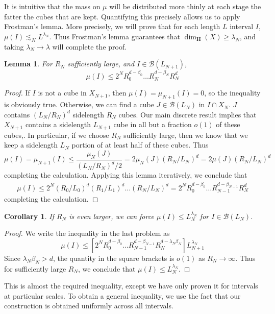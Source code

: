 \documentclass{article}
\theoremstyle{plain}
\newtheorem{lemma}{Lemma}
\newtheorem*{corollary}{Corollary}
\theoremstyle{plain}
\begin{document}
It is intuitive that the mass on $\mu$ will be distributed more thinly at each stage the fatter the cubes that are kept. Quantifying this precisely allows us to apply Frostman's lemma. More precisely, we will prove that for each length $L$ interval $I$, $\mu(I) \lesssim_N L^{\lambda_N}$. Thus Frostman's lemma guarantees that $\dim_{\mathbf{H}}(X) \geq \lambda_N$, and taking $\lambda_N \to \lambda$ will complete the proof.

\begin{lemma}
	For $R_N$ sufficiently large, and $I \in \mathcal{B}(L_{N+1})$,
	\[ \mu(I) \leq 2^N R_0^{d - \beta_0} \dots R_N^{d - \beta_N} R_N^d \]
\end{lemma}
\begin{proof}
	If $I$ is not a cube in $X_{N+1}$, then $\mu(I) = \mu_{N+1}(I) = 0$, so the inequality is obviously true. Otherwise, we can find a cube $J \in \mathcal{B}(L_N)$ in $I \cap X_N$. $J$ contains $(L_N/R_N)^d$ sidelength $R_N$ cubes. Our main discrete result implies that $X_{N+1}$ contains a sidelength $L_{N+1}$ cube in all but a fraction $o(1)$ of these cubes,. In particular, if we choose $R_N$ sufficiently large, then we know that we keep a sidelength $L_N$ portion of at least half of these cubes. Thus
	\[ \mu(I) = \mu_{N+1}(I) \leq \frac{\mu_N(J)}{(L_N/R_N)^d/2} = 2 \mu_N(J) (R_N/L_N)^d = 2 \mu(J) (R_N/L_N)^d \]
	completing the calculation. Applying this lemma iteratively, we conclude that
	\begin{align*}
		\mu(I) \leq 2^N (R_0/L_0)^d (R_1/L_1)^d \dots (R_N/L_N)^d = 2^N R_0^{d - \beta_0} \dots R_{N-1}^{d - \beta_{N-1}} R_N^d
	\end{align*}
	completing the calculation.
\end{proof}

\begin{corollary}
	If $R_N$ is even larger, we can force $\mu(I) \leq L_N^{\lambda_N}$ for $I \in \mathcal{B}(L_N)$.
\end{corollary}
\begin{proof}
	We write the inequality in the last problem as
	\[ \mu(I) \leq [2^N R_0^{d - \beta_0} \dots R_{N-1}^{d - \beta_{N-1}} R_N^{d - \lambda_N \beta_N}] L_{N+1}^{\lambda_N} \]
	Since $\lambda_N \beta_N > d$, the quantity in the square brackets is $o(1)$ as $R_N \to \infty$. Thus for sufficiently large $R_N$, we conclude that $\mu(I) \leq L_N^{\lambda_N}$.
\end{proof}

This is almost the required inequality, except we have only proven it for intervals at particular scales. To obtain a general inequality, we use the fact that our construction is obtained uniformly across all intervals.
\end{document}
